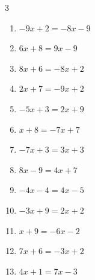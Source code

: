 \begin{multicols}{3}
\begin{enumerate}
        \phantom{$\displaystyle x=5$}

  \item $-9x+2=-8x-9$

        \phantom{$\displaystyle x=11$}

  \item $6x+8=9x-9$


  \item $8x+6=-8x+2$


  \item $2x+7=-9x+2$


  \item $-5x+3=2x+9$


  \item $x+8=-7x+7$


  \item $-7x+3=3x+3$

        \phantom{$\displaystyle x=0$}

  \item $8x-9=4x+7$

        \phantom{$\displaystyle x=4$}

\columnbreak %

\resetques

  \item $-4x-4=4x-5$


  \item $-3x+9=2x+2$


  \item $x+9=-6x-2$


  \item $7x+6=-3x+2$


  \item $4x+1=7x-3$



\end{enumerate}
\end{multicols}
